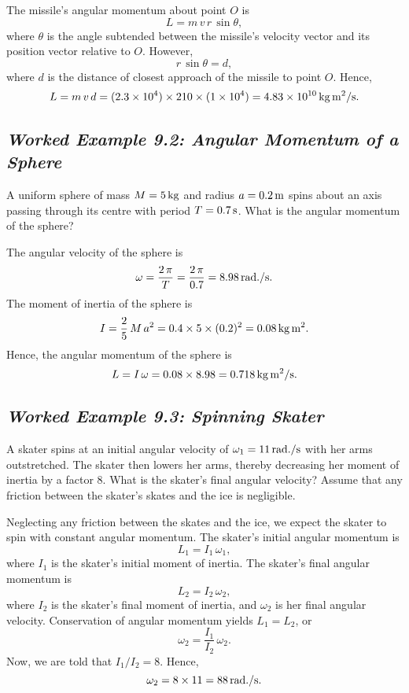 \begin{figure*}[h]
\epsfysize=2in
\centerline{}
\end{figure*}

 The missile's angular momentum about point $O$ is
$$
L = m\,v\,r\,\sin\theta,
$$
where $\theta$ is the angle subtended between the missile's velocity vector
and its position vector relative to $O$. However,
$$
r\,\sin\theta = d,
$$
where $d$ is the distance of closest approach of the missile to point $O$. 
Hence,
$$
L = m\,v\,d = (2.3\times 10^4)\times  210\times (1\times  10^4)= 4.83\times 10^{10}\,{\rm kg\,m^2/s}.
$$


\subsection*{\em Worked Example 9.2: Angular Momentum of a Sphere}
 A uniform sphere of mass $M=5\,{\rm kg}$ and radius $a=0.2\,{\rm m}$
spins about an axis passing through its centre with period $T=0.7\,{\rm s}$. What is the
angular momentum of the sphere?

 The angular velocity of the sphere is
$$
\omega = \frac{2\,\pi}{T} = \frac{2\,\pi}{0.7}= 8.98\,{\rm rad./s}.
$$
The moment of inertia of the sphere is
$$
I = \frac{2}{5}\,M\,a^2 = 0.4\times 5\times(0.2)^2 = 0.08\,{\rm kg\,m^2}.
$$
Hence, the angular momentum of the sphere is
$$
L = I\,\omega = 0.08\times 8.98 = 0.718\,{\rm kg\,m^2/s}.
$$

\subsection*{\em Worked Example 9.3: Spinning Skater}
 A skater spins at an initial angular velocity of $\omega_1=
11\,{\rm rad./s}$ with her arms outstretched. The  skater then lowers her arms, thereby
decreasing her moment of inertia by a factor $8$. What is the skater's final
angular velocity? Assume that any friction between the skater's skates and the
ice is negligible.

 Neglecting any friction between the skates and the ice, we
expect the skater to spin with constant angular momentum. The skater's initial
angular momentum is
$$
L_1 = I_1\,\omega_1,
$$
where $I_1$ is the skater's initial moment of inertia. The skater's final angular
momentum is
$$
L_2 = I_2\,\omega_2,
$$
where $I_2$ is the skater's final moment of inertia, and $\omega_2$ is her final
angular velocity. Conservation of angular momentum yields $L_1=L_2$, or
$$
\omega_2 = \frac{I_1}{I_2}\,\omega_2.
$$
Now, we are told that $I_1/I_2 = 8$. Hence,
$$
\omega_2 = 8\times 11 = 88\,{\rm rad./s}.
$$